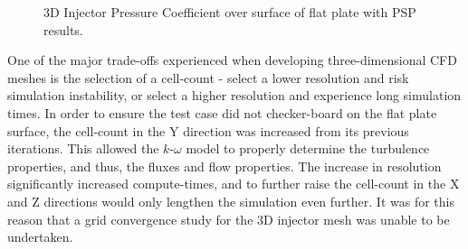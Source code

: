 \begin{figure} [h]
	\centering
	\qquad	
	\caption{3D Injector Pressure Coefficient over surface of flat plate with PSP results.}%
	\label{f:tc3:Cpcontours2}%
\end{figure}

One of the major trade-offs experienced when developing three-dimensional CFD meshes is the selection of a cell-count - select a lower resolution and risk simulation instability, or select a higher resolution and experience long simulation times. In order to ensure the test case did not checker-board on the flat plate surface, the cell-count in the Y direction was increased from its previous iterations. This allowed the $k$-$\omega$ model to properly determine the turbulence properties, and thus, the fluxes and flow properties. The increase in resolution significantly increased compute-times, and to further raise the cell-count in the X and Z directions would only lengthen the simulation even further. It was for this reason that a grid convergence study for the 3D injector mesh was unable to be undertaken. 

